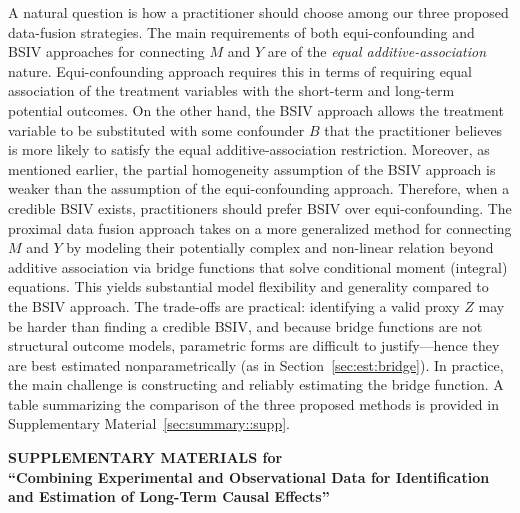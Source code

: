 \documentclass[10pt]{article}
\begin{document}
A natural question is how a practitioner should choose among our three proposed data-fusion strategies. The main requirements of both equi-confounding and BSIV approaches for connecting \(M\) and \(Y\) are of the \emph{equal additive-association} nature. Equi-confounding approach requires this in terms of requiring equal association of the treatment variables with the short-term and long-term potential outcomes. On the other hand, the BSIV approach allows the treatment variable to be substituted with some confounder $B$ that the practitioner believes is more likely to satisfy the equal additive-association restriction. Moreover, as mentioned earlier, the partial homogeneity assumption of the BSIV approach is weaker than the assumption of the equi-confounding approach. Therefore, when a credible BSIV exists, practitioners should prefer BSIV over equi-confounding. The proximal data fusion approach takes on a more generalized method for connecting \(M\) and \(Y\) by modeling their potentially complex and non-linear relation beyond additive association via bridge functions that solve conditional moment (integral) equations. This yields substantial model flexibility and generality compared to the BSIV approach. The trade-offs are practical: identifying a valid proxy \(Z\) may be harder than finding a credible BSIV, and because bridge functions are not structural outcome models, parametric forms are difficult to justify—hence they are best estimated nonparametrically (as in Section~\ref{sec:est:bridge}). In practice, the main challenge is constructing and reliably estimating the bridge function. A table summarizing the comparison of the three proposed methods is provided in Supplementary Material~\ref{sec:summary::supp}.













\newpage
\begin{center}
{\Large\bf SUPPLEMENTARY MATERIALS for\\ ``Combining Experimental and Observational Data for Identification and Estimation of Long-Term Causal Effects''}
\end{center}

\vspace{10mm}




\allowdisplaybreaks
\end{document}
